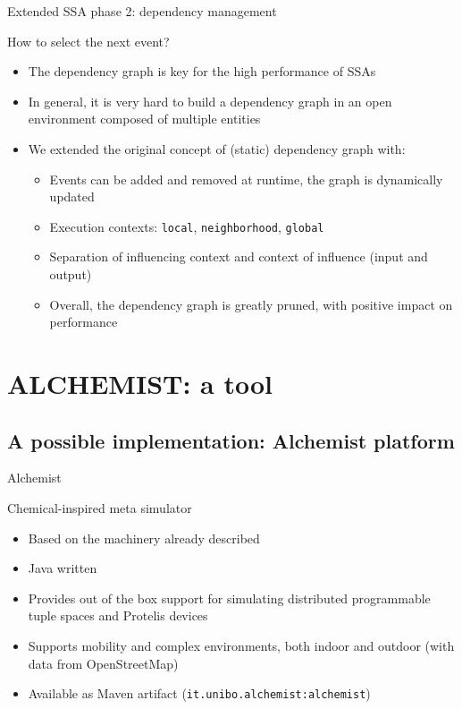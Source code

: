 \documentclass[presentation]{beamer} %
\begin{document}
\begin{frame}{Extended SSA phase 2: dependency management}
  \begin{block}{How to select the next event?}
    \begin{itemize}
      \item The dependency graph is key for the high performance of SSAs \cite{slepoy2008}
      \item In general, it is very hard to build a dependency graph in an open environment composed of multiple entities
      \item We extended the original concept of (static) dependency graph with:
      \begin{itemize}
        \item Events can be added and removed at runtime, the graph is dynamically updated
        \item Execution contexts: \texttt{local}, \texttt{neighborhood}, \texttt{global}
        \item Separation of influencing context and context of influence (input and output)
        \item Overall, the dependency graph is greatly pruned, with positive impact on performance
      \end{itemize}
    \end{itemize}
  \end{block}
\end{frame}


\section{ALCHEMIST: a tool}



\subsection{A possible implementation: Alchemist platform}

\begin{frame}{Alchemist}
  \begin{block}{Chemical-inspired meta simulator}
    \begin{itemize}
      \item Based on the machinery already described
      \item Java written
      \item Provides out of the box support for simulating distributed programmable tuple spaces and Protelis \cite{protelis} devices
      \item Supports mobility and complex environments, both indoor and outdoor (with data from OpenStreetMap)
      \item Available as Maven artifact (\texttt{it.unibo.alchemist:alchemist})
    \end{itemize}
  \end{block}
\end{frame}
\end{document}
